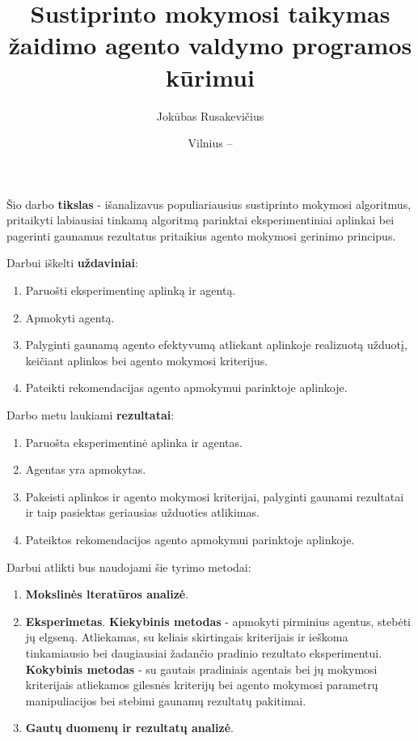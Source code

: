 \documentclass{VUMIFPSbakalaurinis}
\title{Sustiprinto mokymosi taikymas žaidimo agento valdymo programos kūrimui}
\author{Jokūbas Rusakevičius}
\date{Vilnius – \the\year}
\begin{document}
\maketitle

\setcounter{page}{2}





Šio darbo \textbf{tikslas} - išanalizavus populiariausius sustiprinto mokymosi algoritmus, pritaikyti labiausiai tinkamą algoritmą parinktai eksperimentiniai aplinkai bei pagerinti gaunamus rezultatus pritaikius agento mokymosi gerinimo principus.\par

Darbui iškelti \textbf{uždaviniai}:\par

\begin{enumerate}
	\item Paruošti eksperimentinę aplinką ir agentą.
	\item Apmokyti agentą.
	\item Palyginti gaunamą agento efektyvumą atliekant aplinkoje realizuotą užduotį, keičiant aplinkos bei agento mokymosi kriterijus.
	\item Pateikti rekomendacijas agento apmokymui parinktoje aplinkoje.
\end{enumerate}

Darbo metu laukiami \textbf{rezultatai}:

\begin{enumerate}
	\item Paruošta eksperimentinė aplinka ir agentas.
	\item Agentas yra apmokytas.
	\item Pakeisti aplinkos ir agento mokymosi kriterijai, palyginti gaunami rezultatai ir taip pasiektas geriausias užduoties atlikimas.
	\item Pateiktos rekomendacijos agento apmokymui parinktoje aplinkoje.
\end{enumerate}

Darbui atlikti bus naudojami šie tyrimo metodai:

\begin{enumerate}
	\item \textbf{Mokslinės lteratūros analizė}.
	\item \textbf{Eksperimetas}.
	\subitem \textbf{Kiekybinis metodas} - apmokyti pirminius agentus, stebėti jų elgseną. Atliekamas, su keliais skirtingais kriterijais ir ieškoma tinkamiausio bei daugiausiai žadančio pradinio rezultato eksperimentui.
	\subitem \textbf{Kokybinis metodas} - su gautais pradiniais agentais bei jų mokymosi kriterijais atliekamos gilesnės kriterijų bei agento mokymosi parametrų manipuliacijos bei stebimi gaunamų rezultatų pakitimai.
	\item \textbf{Gautų duomenų ir rezultatų analizė}.
\end{enumerate}
\end{document}
